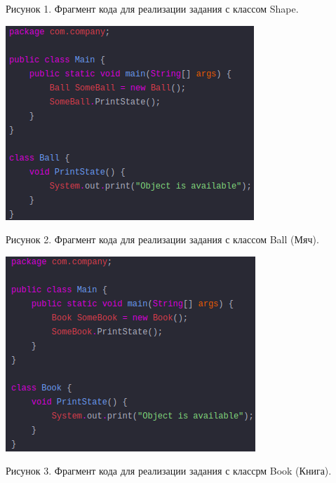 \documentclass{article}
\begin{document}
\caption{Рисунок 1. Фрагмент кода для реализации задания с классом Shape.}

\includegraphics[width=0.9\linewidth]{view2.png}

\caption{Рисунок 2. Фрагмент кода для реализации задания с классом Ball (Мяч).}

\includegraphics[width=0.9\linewidth]{view3.png}

\caption{Рисунок 3. Фрагмент кода для реализации задания с классрм Book (Книга).}
\end{document}
